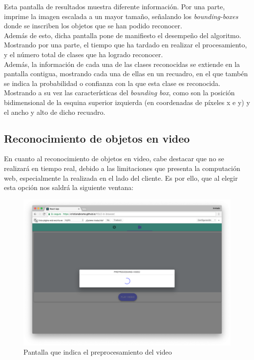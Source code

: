 \documentclass[a4paper]{article}
\begin{document}
Esta pantalla de resultados muestra diferente información. Por una parte, imprime la imagen escalada a
un mayor tamaño, señalando los \textit{bounding-boxes} donde se inscriben los objetos que se han podido reconocer. \\ 

Además de esto, dicha pantalla pone de manifiesto el desempeño del algoritmo. Mostrando por una parte,
el tiempo que ha tardado en realizar el procesamiento, y el número total de clases que ha logrado 
reconocer.  \\

Además, la información de cada una de las clases reconocidas se extiende en la pantalla
contigua, mostrando cada una de ellas en un recuadro, en el que tambén se indica la
probabilidad o confianza con la que esta clase es reconocida. Mostrando a su vez las características 
del \textit{bounding box}, como son la posición bidimensional de la esquina superior izquierda (en 
coordenadas de píxeles x e y) y el ancho y alto de dicho recuadro.

\subsection{Reconocimiento de objetos en video}
En cuanto al reconocimiento de objetos en video, cabe destacar que no se realizará en tiempo real,
debido a las limitaciones que presenta la computación web, especialmente la realizada en el lado 
del cliente. Es por ello, que al elegir esta opción nos saldrá la siguiente ventana:

\begin{figure}[ht]
    \centering
    \includegraphics[scale=0.25]{images/video-loading.png}
    \caption{Pantalla que indica el preprocesamiento del video}
    \label{fig:my_label}
\end{figure}
\end{document}
